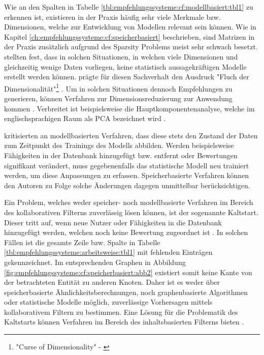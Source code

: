 Wie an den Spalten in Tabelle \ref{tbl:empfehlungssysteme:cf:modellbasiert:tbl1} zu erkennen ist, existieren in der Praxis häufig sehr viele Merkmale bzw. Dimensionen, welche zur Entwicklung von Modellen relevant sein können. Wie in Kapitel \ref{ch:empfehlungssysteme:cf:speicherbasiert} beschrieben, sind Matrizen in der Praxis zusätzlich aufgrund des Sparsity Problems meist sehr schwach besetzt. \textcite[S. 1]{boratto:2014} stellten fest, dass in solchen Situationen, in welchen viele Dimensionen und gleichzeitig wenige Daten vorliegen, keine statistisch aussagekräftigen Modelle erstellt werden können. \textcite[S. 94, Z. 7]{bellman:1961} prägte für diesen Sachverhalt den Ausdruck "Fluch der Dimensionalität"\footnote{"Curse of Dimensionality" - \textcite[S. 94, Z. 7]{bellman:1961}} \cite[S. 1]{boratto:2014}. Um in solchen Situationen dennoch Empfehlungen zu generieren, können Verfahren zur Dimensionsreduzierung zur Anwendung kommen \cite[S. 47]{recommenderSystems:2016}. Verbreitet ist beispielsweise die Hauptkomponentenanalyse, welche im englischsprachigen Raum als \ac{PCA} bezeichnet wird \cite[S. 1]{vaswani:2018}.

\textcite[S. 1f.]{pennock:2000} kritisierten an modellbasierten Verfahren, dass diese stets den Zustand der Daten zum Zeitpunkt des Trainings des Modells abbilden. Werden beispielsweise Fähigkeiten in der Datenbank hinzugefügt bzw. entfernt oder Bewertungen signifikant verändert, muss gegebenenfalls das statistische Modell neu trainiert werden, um diese Anpassungen zu erfassen. Speicherbasierte Verfahren können den Autoren zu Folge solche Änderungen dagegen unmittelbar berücksichtigen.

Ein Problem, welches weder speicher- noch modellbasierte Verfahren im Bereich des kollaborativen Filterns zuverlässig lösen können, ist der sogenannte Kaltstart. Dieser tritt auf, wenn neue Nutzer oder Fähigkeiten in die Datenbank hinzugefügt werden, welchen noch keine Bewertung zugeordnet ist \cite[S. 5]{huang:2004}. In solchen Fällen ist die gesamte Zeile bzw. Spalte in Tabelle \ref{tbl:empfehlungssysteme:arbeitsweise:tbl1} mit fehlenden Einträgen gekennzeichnet. Im entsprechenden Graphen in Abbildung \ref{fig:empfehlungssysteme:cf:speicherbasiert:abb2} existiert somit keine Kante von der betrachteten Entität zu anderen Knoten. Daher ist es weder über speicherbasierte Ähnlichkeitsberechnungen, noch graphenbasierte Algorithmen oder statistische Modelle möglich, zuverlässige Vorhersagen mittels kollaborativem Filtern zu bestimmen. Eine Lösung für die Problematik des Kaltstarts können Verfahren im Bereich des inhaltsbasierten Filterns bieten \cite[S. 15]{recommenderSystems:2016}.

